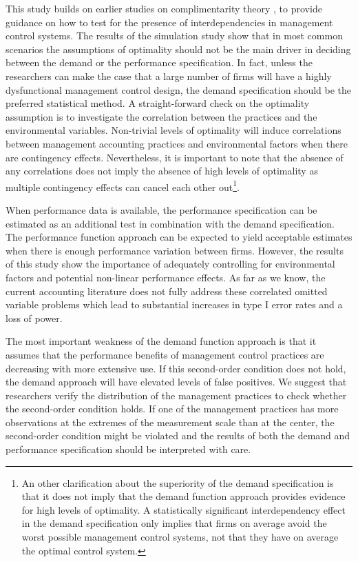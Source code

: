 \documentclass[12pt]{article}
\begin{document}
This study builds on earlier studies on complimentarity theory
\citep{Milgrom1995, Grabner2013}, to provide guidance on how to test for
the presence of interdependencies in management control systems. The
results of the simulation study show that in most common scenarios the
assumptions of optimality should not be the main driver in deciding
between the demand or the performance specification. In fact, unless the
researchers can make the case that a large number of firms will have a
highly dysfunctional management control design, the demand specification
should be the preferred statistical method. A straight-forward check on
the optimality assumption is to investigate the correlation between the
practices and the environmental variables. Non-trivial levels of
optimality will induce correlations between management accounting
practices and environmental factors when there are contingency effects.
Nevertheless, it is important to note that the absence of any
correlations does not imply the absence of high levels of optimality as
multiple contingency effects can cancel each other out\footnote{An other
  clarification about the superiority of the demand specification is
  that it does not imply that the demand function approach provides
  evidence for high levels of optimality. A statistically significant
  interdependency effect in the demand specification only implies that
  firms on average avoid the worst possible management control systems,
  not that they have on average the optimal control system.}.

When performance data is available, the performance specification can be
estimated as an additional test in combination with the demand
specification. The performance function approach can be expected to
yield acceptable estimates when there is enough performance variation
between firms. However, the results of this study show the importance of
adequately controlling for environmental factors and potential
non-linear performance effects. As far as we know, the current
accounting literature does not fully address these correlated omitted
variable problems which lead to substantial increases in type I error
rates and a loss of power.

The most important weakness of the demand function approach is that it
assumes that the performance benefits of management control practices
are decreasing with more extensive use. If this second-order condition
does not hold, the demand approach will have elevated levels of false
positives. We suggest that researchers verify the distribution of the
management practices to check whether the second-order condition holds.
If one of the management practices has more observations at the extremes
of the measurement scale than at the center, the second-order condition
might be violated and the results of both the demand and performance
specification should be interpreted with care.
\end{document}
